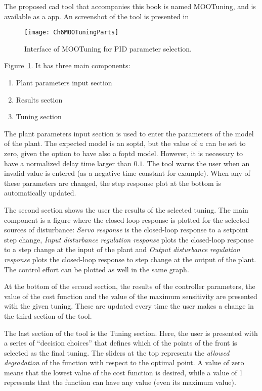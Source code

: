 The proposed \gls{cad} tool that accompanies this book is named MOOTuning, and is available as a \matlab{} app. An screenshot of the tool is presented in 
\begin{figure}[tb]
	\centering
	\texttt{[image: Ch6MOOTuningParts]}
	\caption{Interface of MOOTuning for PID parameter selection.}
	\label{fig:Ch6MOOTuningParts}
\end{figure}
Figure~\ref{fig:Ch6MOOTuningParts}. It has three main components:
\begin{enumerate}
	\item Plant parameters input section
	\item Results section
	\item Tuning section
\end{enumerate}
%
The plant parameters input section is used to enter the parameters of the model of the plant. The expected model is an \gls{soptd}, but the value of $a$ can be set to zero, given the option to have also a \gls{foptd} model. However, it is necessary to have a normalized delay time larger than $0.1$. The tool warns the user when an invalid value is entered (as a negative time constant for example). When any of these parameters are changed, the step response plot at the bottom is automatically updated.

The second section shows the user the results of the selected tuning. The main component is a figure where the closed-loop response is plotted for the selected sources of disturbance: \textit{Servo response} is the closed-loop response to a setpoint step change, \textit{Input disturbance regulation response} plots the closed-loop response to a step change at the input of the plant and \textit{Output disturbance regulation response} plots the closed-loop response to  step change at the output of the plant. The control effort can be plotted as well in the same graph.

At the bottom of the second section, the results of the controller parameters, the value of the cost function and the value of the maximum sensitivity are presented with the given tuning. These are updated every time the user makes a change in the third section of the tool.

The last section of the tool is the Tuning section. Here, the user is presented with a series of ``decision choices'' that defines which of the points of the front is selected as the final tuning. The sliders at the top represents the \textit{allowed degradation} of the function with respect to the optimal point. A value of zero means that the lowest value of the cost function is desired, while a value of 1 represents that the function can have any value (even its maximum value).

